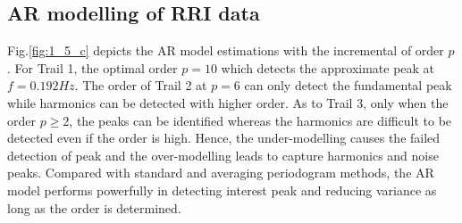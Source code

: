 \subsection{AR modelling of RRI data}
Fig.\ref{fig:1_5_c} depicts the AR model estimations with the incremental of order $p$. For Trail 1, the optimal order $p=10$ which detects the approximate peak at $f=0.192Hz$. The order of Trail 2 at $p=6$ can only detect the fundamental peak while harmonics can be detected with higher order. As to Trail 3, only when the order $p\ge2$, the peaks can be identified whereas the harmonics are difficult to be detected even if the order is high. Hence, the under-modelling causes the failed detection of peak and the over-modelling leads to capture harmonics and noise peaks. Compared with standard and averaging periodogram methods, the AR model performs powerfully in detecting interest peak and reducing variance as long as the order is determined.

